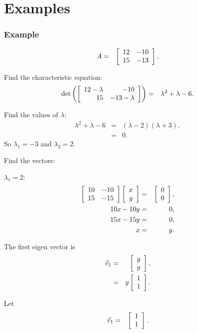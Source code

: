 \section{Examples}

\begin{frame}
  \frametitle{Example}

  \begin{eqnarray*}
    A & = & \left[ \begin{array}{rr} 12 & -10 \\ 15 & -13 \end{array} \right].
  \end{eqnarray*}

  Find the characteristic equation:
  \begin{eqnarray*}
    \det\left(\left[ \begin{array}{rr} 12-\lambda & -10 \\ 15 & -13-\lambda \end{array} \right]\right) & = & \lambda^2+\lambda-6.
  \end{eqnarray*}

  Find the values of $\lambda$:
  \begin{eqnarray*}
    \lambda^2+\lambda-6 & = & (\lambda-2)(\lambda+3), \\
    & = & 0.
  \end{eqnarray*}
  So $\lambda_1 = -3$ and $\lambda_2=2$.

\end{frame}


\begin{frame}
  Find the vectors:

  $\lambda_1 = 2$:
  \begin{eqnarray*}
    \left[ \begin{array}{rr} 10 & -10 \\ 15 & -15 \end{array} \right] \left[ \begin{array}{r} x \\ y \end{array} \right] & = & \left[ \begin{array}{r} 0 \\ 0 \end{array} \right], \\
    10x - 10y & = & 0, \\
    15x - 15y & = & 0, \\
    x & = & y.
  \end{eqnarray*}

  The first eigen vector is 
  \begin{eqnarray*}
    \vec{v}_1 & = & \left[ \begin{array}{r} y \\ y \end{array} \right], \\
    & = & y \left[ \begin{array}{r} 1 \\ 1 \end{array} \right].
  \end{eqnarray*}

  Let
  \begin{eqnarray*}
    \vec{v}_1 & = & \left[ \begin{array}{r} 1 \\ 1 \end{array} \right].
  \end{eqnarray*}

\end{frame}

